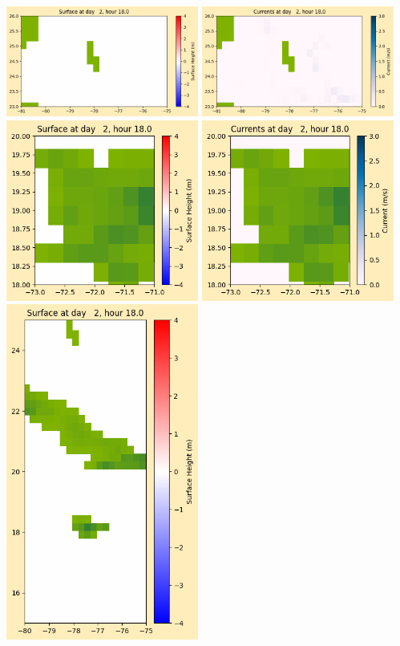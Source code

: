 \documentclass[11pt]{article}
\begin{document}
\vskip 10pt 
\includegraphics[width=0.475\textwidth]{frame0023fig1003.png}
\includegraphics[width=0.475\textwidth]{frame0023fig1004.png}
\vskip 10pt 
\includegraphics[width=0.475\textwidth]{frame0023fig1005.png}
\includegraphics[width=0.475\textwidth]{frame0023fig1006.png}
\vskip 10pt 
\includegraphics[width=0.475\textwidth]{frame0023fig1007.png}
\end{document}
